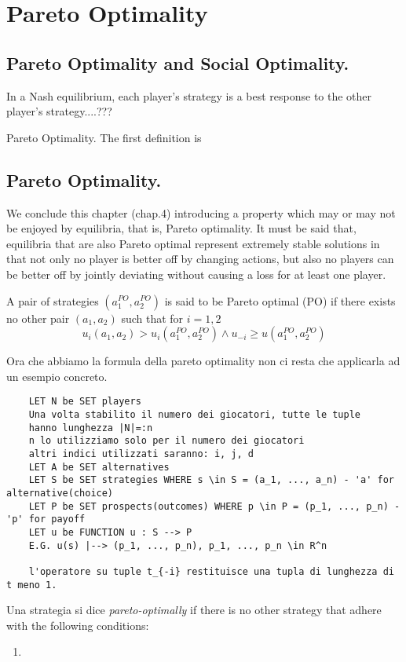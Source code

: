 \chapter{Pareto Optimality}

\section{Pareto Optimality and Social Optimality. \cite{kleinberg2010}}

In a Nash equilibrium, each player's strategy is a best response to the other player's strategy....???

Pareto Optimality. The first definition is 

\section{Pareto Optimality. \cite{bauso2014}}
We conclude this chapter (chap.4) introducing a property which may or may not be enjoyed by equilibria, that is, Pareto optimality. 
It must be said that, equilibria that are also Pareto optimal represent extremely stable solutions in that not only no player is better off by changing actions, but also no players can be better off by jointly deviating without causing a loss for at least one player.


\begin{definizione}
	A pair of strategies $(a_{1}^{PO}, a_{2}^{PO})$ is said to be Pareto optimal (PO) if there exists no other pair $(a_1,a_2)$ such that for $i=1,2$
		\[
			u_i(a_1, a_2) > u_i(a_{1}^{PO}, a_{2}^{PO}) \wedge u_{-i} \ge u(a_{1}^{PO}, a_{2}^{PO}) 
		\]
\end{definizione}	

Ora che abbiamo la formula della pareto optimality non ci resta che applicarla ad un esempio concreto. 

\begin{verbatim}
	LET N be SET players
	Una volta stabilito il numero dei giocatori, tutte le tuple 
	hanno lunghezza |N|=:n
	n lo utilizziamo solo per il numero dei giocatori
	altri indici utilizzati saranno: i, j, d
	LET A be SET alternatives
	LET S be SET strategies WHERE s \in S = (a_1, ..., a_n) - 'a' for alternative(choice)
	LET P be SET prospects(outcomes) WHERE p \in P = (p_1, ..., p_n) - 'p' for payoff
	LET u be FUNCTION u : S --> P
	E.G. u(s) |--> (p_1, ..., p_n), p_1, ..., p_n \in R^n
	
	l'operatore su tuple t_{-i} restituisce una tupla di lunghezza di t meno 1.
\end{verbatim}

\begin{definizione}
	Una strategia si dice \emph{pareto-optimally} if there is no other strategy that adhere with the following conditions:
	\begin{enumerate}
		\item 
	\end{enumerate}
\end{definizione}



